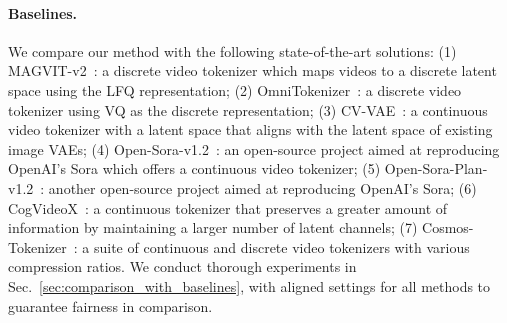 \documentclass{article} %
\begin{document}
\paragraph{Baselines.}
We compare our method with the following state-of-the-art solutions:
(1) MAGVIT-v2~\citep{yu2024language}: a discrete video tokenizer which maps videos to a discrete latent space using the LFQ representation;
(2) OmniTokenizer~\citep{wang2024omnitokenizer}: a discrete video tokenizer using VQ as the discrete representation;
(3) CV-VAE~\citep{zhao2024cv}: a continuous video tokenizer with a latent space that aligns with the latent space of existing image VAEs;
(4) Open-Sora-v1.2~\citep{repoopensora}: an open-source project aimed at reproducing OpenAI’s Sora which offers a continuous video tokenizer;
(5) Open-Sora-Plan-v1.2~\citep{repoopensoraplan}: another open-source project aimed at reproducing OpenAI’s Sora;
(6) CogVideoX~\citep{yang2024cogvideox}: a continuous tokenizer that preserves a greater amount of information by maintaining a larger number of latent channels;
(7) Cosmos-Tokenizer~\citep{repocosmos}: a suite of continuous and discrete video tokenizers with various compression ratios.
We conduct thorough experiments in Sec.~\ref{sec:comparison_with_baselines}, with aligned settings for all methods to guarantee fairness in comparison.
\end{document}
